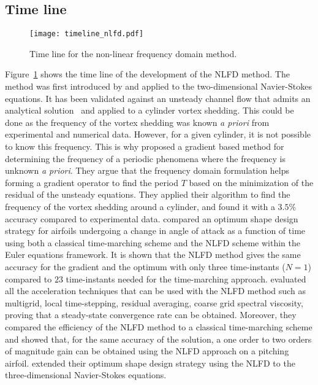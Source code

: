 \subsection{Time line}
\begin{figure}[htbp]
  \centering
  \texttt{[image: timeline\_nlfd.pdf]}
  \caption{Time line for the non-linear frequency domain method.}
  \label{fig:timeline_nlfd}
\end{figure}
Figure~\ref{fig:timeline_nlfd} shows the time line of the
development of the NLFD method.
The method was first introduced by \citet{McMullen2001}
and applied to the two-dimensional
Navier-Stokes equations. It has been validated against an
unsteady channel flow that admits an analytical 
solution~\cite{Merkle1987} and applied to a cylinder
vortex shedding. This could be done as the frequency of the
vortex shedding was known \emph{a priori} from experimental
and numerical data. However, for a given cylinder, it is not
possible to know this frequency. This is why
 \citet{McMullen2002, McMullen2006a}
proposed a gradient based method for determining the frequency
of a periodic phenomena where the frequency is unknown
\emph{a priori}. They argue that the frequency domain formulation
helps forming a gradient operator to find the period $T$ based
on the minimization of the residual of the unsteady equations.
They applied their algorithm to find the frequency of the vortex
shedding around a cylinder, and found it with a $3.5\%$ accuracy
compared to experimental data.
\citet{Nadarajah2003} compared an optimum shape design 
strategy for 
airfoils undergoing a change 
in angle of attack as a function of time 
using both a classical time-marching scheme
and the NLFD scheme within the Euler equations
framework. It is shown that the NLFD method
gives the same accuracy for the gradient and the optimum with only 
three time-instants ($N=1$)
compared to $23$ time-instants needed for 
the time-marching approach.
\citet{McMullen2006} evaluated all the acceleration techniques
that can be used with the NLFD method such as multigrid, local
time-stepping, residual averaging, coarse grid spectral viscosity,
proving that a steady-state convergence rate can be obtained.
Moreover, they compared the efficiency of the
NLFD method to a classical time-marching
scheme and showed that, for the same accuracy of the
solution, a one order to two orders of magnitude gain can
be obtained using the NLFD approach on a pitching airfoil.
\citet{Nadarajah2007} extended their optimum shape design strategy
using the NLFD to the three-dimensional Navier-Stokes equations.
